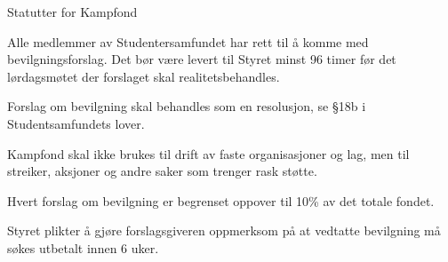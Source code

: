 \begin{fond}{Statutter for Kampfond}

  \begin{fondsparagraf}
Alle medlemmer av Studentersamfundet har rett til å komme med bevilgningsforslag. Det bør være levert til Styret
minst 96 timer før det lørdagsmøtet der forslaget skal realitetsbehandles.
  \end{fondsparagraf}

  \begin{fondsparagraf}
Forslag om bevilgning skal behandles som en resolusjon, se §18b i Studentsamfundets lover.
  \end{fondsparagraf}
  
  \begin{fondsparagraf}
Kampfond skal ikke brukes til drift av faste organisasjoner og lag, men til streiker, aksjoner og andre saker som
trenger rask støtte.
  \end{fondsparagraf}
  
  \begin{fondsparagraf}
Hvert forslag om bevilgning er begrenset oppover til 10\% av det totale fondet.
  \end{fondsparagraf}
  
  \begin{fondsparagraf}
Styret plikter å gjøre forslagsgiveren oppmerksom på at vedtatte bevilgning må søkes utbetalt innen 6 uker.
  \end{fondsparagraf}  

\end{fond}

